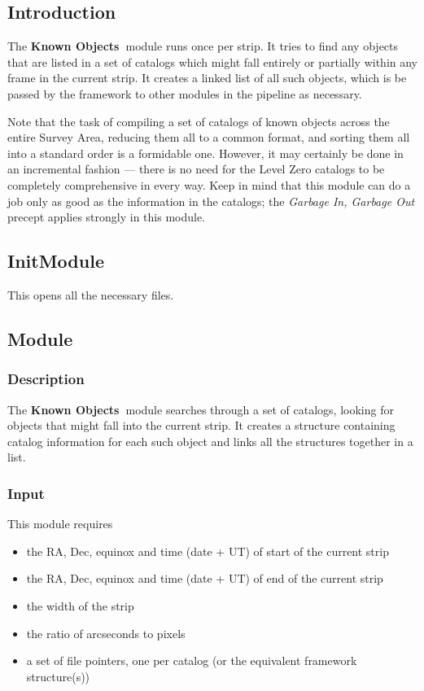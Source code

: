
\def \kom{{\bf Known Objects\ }}
\def \catobj{CAT\_OBJ }

\subsection {Introduction}

  The \kom module runs once per strip.
It tries to find any objects that are listed
in a set of catalogs which might fall entirely
or partially within any frame in the current strip.
It creates a linked
list of all such objects, which is be passed by the 
framework to other modules
in the pipeline as necessary.

  Note that the task of compiling a set of catalogs of known 
objects across the entire Survey Area, reducing them all
to a common format, and sorting them all into a standard
order is a formidable one. 
However, it may certainly be done in an incremental 
fashion --- there is no need for the Level Zero catalogs to
be completely comprehensive in every way.
Keep in mind that this module can do a job only as good as
the information in the catalogs; the {\it Garbage In, Garbage
Out} precept applies strongly in this module.

\subsection{InitModule}

This opens all the necessary files.

\subsection {Module}

\subsubsection {Description}

  The \kom module searches through a set of catalogs, looking
for objects that might fall into the current strip.  It creates
a structure containing catalog information for each such object
and links all the structures together in a list.

\subsubsection {Input}

  This module requires

\begin{itemize}
  \item the RA, Dec, equinox and time (date + UT) of start of the current 
        strip
  \item the RA, Dec, equinox and time (date + UT) of end of the current 
        strip
  \item the width of the strip
  \item the ratio of arcseconds to pixels
  \item a set of file pointers, one per catalog (or the equivalent
        framework structure(s))
\end{itemize}

